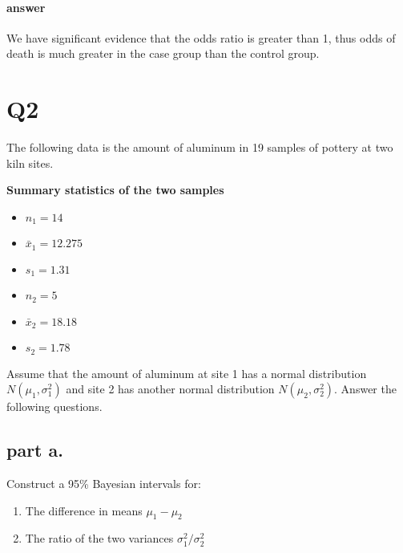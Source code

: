 \documentclass[12pt,a4paper]{article}
\begin{document}
\paragraph{answer}
We have significant evidence that the odds ratio is greater than 1, thus odds of death is much greater in the case group than the control group.

\section{Q2}
The following data is the amount of aluminum in 19 samples of pottery at two kiln sites.

\begin{center}
	\textbf{Summary statistics of the two samples}
\end{center}

\begin{minipage}{.45\textwidth}
\begin{itemize}
	\item $n_1 = 14$
	\item $\bar{x}_1 = 12.275$
	\item $s_1 = 1.31$
\end{itemize}
\end{minipage}
\begin{minipage}{.45\textwidth}
\begin{itemize}
	\item $n_2 = 5$
	\item $\bar{x}_2 = 18.18$
	\item $s_2 = 1.78$
\end{itemize}
\end{minipage}

\vspace{.5cm}

Assume that the amount of aluminum at site 1 has a normal distribution $N(\mu_1, \sigma^2_1)$ and site 2 has another normal distribution $N(\mu_2, \sigma^2_2)$.
Answer the following questions.

\subsection{part a.}
Construct a 95\% Bayesian intervals for:

\begin{enumerate}
	\item The difference in means $\mu_1 - \mu_2$
	\item The ratio of the two variances $\sigma^2_1 / \sigma^2_2$
\end{enumerate}
\end{document}
